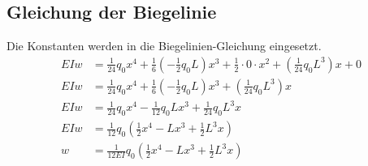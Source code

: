 \subsection{Gleichung der Biegelinie}
Die Konstanten werden in die Biegelinien-Gleichung eingesetzt.
\begin{align}
	EIw&=
	\frac{1}{24}q_0x^4+\frac{1}{6}\left(-\frac{1}{2}q_0L\right)x^3+\frac{1}{2}\cdot0\cdot x^2+\left(\frac{1}{24}q_0L^3\right)x+0
  \\
	EIw&=
	\frac{1}{24}q_0x^4+\frac{1}{6}\left(-\frac{1}{2}q_0L\right)x^3+\left(\frac{1}{24}q_0L^3\right)x
	\\
	EIw&=
	\frac{1}{24}q_0x^4-\frac{1}{12}q_0Lx^3+\frac{1}{24}q_0L^3x
	\\
	EIw&=
	\frac{1}{12}q_0\left(\frac{1}{2}x^4-Lx^3+\frac{1}{2}L^3x\right)
	\\
	w&=
	\frac{1}{12EI}q_0\left(\frac{1}{2}x^4-Lx^3+\frac{1}{2}L^3x\right)
\end{align}

